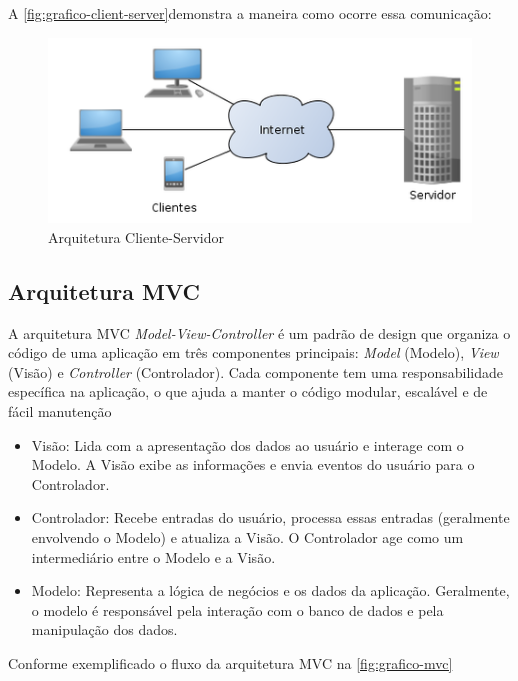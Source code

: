 A \autoref{fig:grafico-client-server}demonstra a maneira como ocorre essa comunicação:

\begin{figure}[htb]
    \caption{\label{fig:grafico-client-server}Arquitetura Cliente-Servidor}
    \begin{center}
        \includegraphics[scale=0.9]{imagens/arquitetura-cliente-servidor.png}
    \end{center}
\end{figure}


\subsection{Arquitetura MVC}
A arquitetura MVC \textit{Model-View-Controller} é um padrão de design que organiza o código de uma aplicação em três componentes principais: \textit{Model} (Modelo), \textit{View} (Visão) e \textit{Controller} (Controlador). Cada componente tem uma responsabilidade específica na aplicação, o que ajuda a manter o código modular, escalável e de fácil manutenção\cite{engsoftmoderna}

\begin{itemize}
    \item Visão: Lida com a apresentação dos dados ao usuário e interage com o Modelo. A Visão exibe as informações e envia eventos do usuário para o Controlador.
    \item Controlador: Recebe entradas do usuário, processa essas entradas (geralmente envolvendo o Modelo) e atualiza a Visão. O Controlador age como um intermediário entre o Modelo e a Visão.
    \item Modelo: Representa a lógica de negócios e os dados da aplicação. Geralmente, o modelo é responsável pela interação com o banco de dados e pela manipulação dos dados.
\end{itemize}
Conforme exemplificado o fluxo da arquitetura MVC na \autoref{fig:grafico-mvc}

